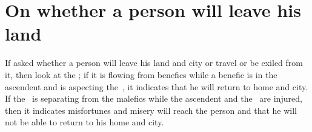\section{On whether a person will leave his land}
If asked whether a person will leave his land and city or travel or be exiled from it, then look at the \Moon; if it is flowing from benefics while a benefic is in the ascendent and is aspecting the \Moon\,, it indicates that he will return to home and city. If the \Moon\, is separating from the malefics while the ascendent and the \Moon\, are injured, then it indicates misfortunes and misery will reach the person and that he will not be able to return to his home and city.
